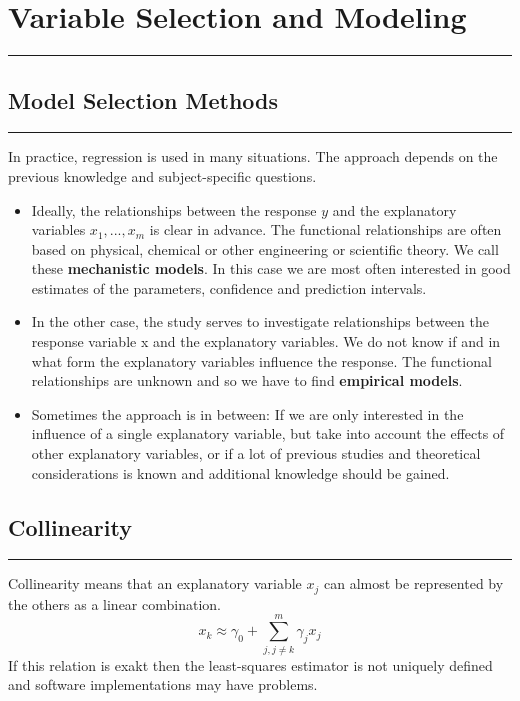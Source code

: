 \section{Variable Selection and Modeling}
\noindent\rule[\linienAbstand]{\linewidth}{\linienDickeDick}

\subsection{Model Selection Methods}
\noindent\rule[\linienAbstand]{\linewidth}{\linienDicke}
In practice, regression is used in many situations. The approach depends on the previous knowledge and subject-specific questions.\\
\begin{itemize}
  \item Ideally, the relationships between the response $y$ and the explanatory variables $x_1, ..., x_m$  is clear in advance. The functional relationships are often based on physical, chemical or other engineering or scientific theory. We call these \textbf{mechanistic models}. In this case we are most often interested in good estimates of the parameters, confidence and prediction intervals.
  \item  In the other case, the study serves to investigate relationships between the response variable x and the explanatory variables. We do not know if and in what form the explanatory variables influence the response. The functional relationships are unknown and so we have to find \textbf{empirical models}.
  \item Sometimes the approach is in between: If we are only interested in the influence of a single explanatory variable, but take into account the effects of other explanatory variables, or if a lot of previous studies and theoretical considerations is known and additional knowledge should be gained.
\end{itemize}


\subsection{Collinearity}
\noindent\rule[\linienAbstand]{\linewidth}{\linienDicke}
Collinearity means that an explanatory variable $x_j$ can almost be represented by the others as a linear combination.
\begin{equation}
  x_k \approx \gamma_0 + \sum^m_{j, j\neq k}\gamma_j x_j
\end{equation}
If this relation is exakt then the least-squares estimator is not uniquely defined and software implementations may have problems.\\

